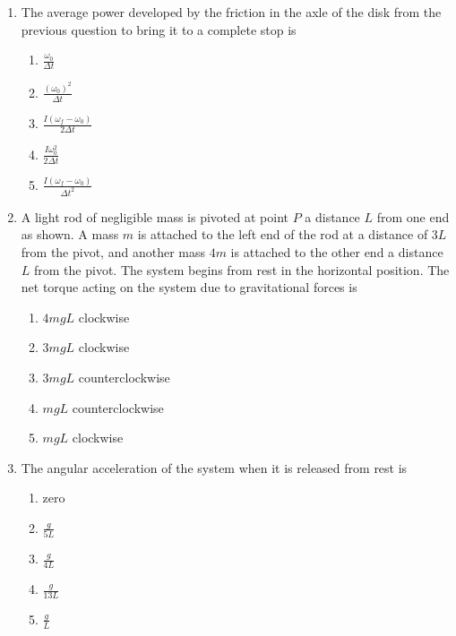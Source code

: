 \documentclass{../../../oss-apphys}
\begin{document}
\begin{multicols}{2}
\begin{enumerate}[leftmargin=18pt]
  \item The average power developed by the friction in the axle of the disk
    from the previous question to bring it to a complete stop is
    \begin{enumerate}[nosep,leftmargin=18pt,label=(\Alph*)]
    \item $\displaystyle\frac{\omega_0}{\Delta t}$
    \item $\displaystyle\frac{(\omega_0)^2}{\Delta t}$
    \item $\displaystyle\frac{I(\omega_f-\omega_0)}{2\Delta t}$
    \item $\displaystyle\frac{I\omega_0^2}{2\Delta t}$
    \item $\displaystyle\frac{I(\omega_f-\omega_0)}{\Delta t^2}$
    \end{enumerate}
    
  \item A light rod of negligible mass is pivoted at point $P$ a distance $L$
    from one end as shown. A mass $m$ is attached to the left end of the rod at
    a distance of $3L$ from the pivot, and another mass $4m$ is attached to the
    other end a distance $L$ from the pivot. The system begins from rest in the
    horizontal position. The net torque acting on the system due to
    gravitational forces is
    \begin{center}
    \end{center}
    \begin{enumerate}[nosep,leftmargin=18pt,label=(\Alph*)]
    \item $4mgL$ clockwise
    \item $3mgL$ clockwise
    \item $3mgL$ counterclockwise
    \item $mgL$ counterclockwise
    \item $mgL$ clockwise
    \end{enumerate}
    \vspace{.7in}
    
  \item The angular acceleration of the system when it is released from rest is
    \begin{enumerate}[nosep,leftmargin=18pt,label=(\Alph*)]
    \item zero
    \item $\displaystyle\frac{g}{5L}$
    \item $\displaystyle\frac{g}{4L}$
    \item $\displaystyle\frac{g}{13L}$
    \item  $\displaystyle\frac{g}{L}$
    \end{enumerate}
  \end{enumerate}
\end{multicols}
\end{document}
